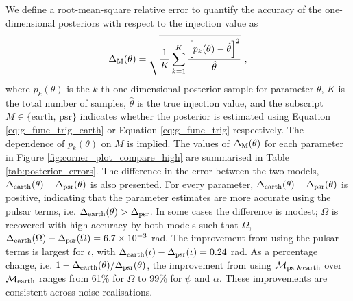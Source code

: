 \documentclass[fleqn,usenatbib,useAMS]{mnras}
\begin{document}
We define a root-mean-square relative error to quantify the accuracy of the one-dimensional posteriors with respect to the injection value as
\begin{equation}
\Delta_{\rm M}(\theta) = \sqrt{\frac{1}{K}\sum_{k=1}^{K} \frac{ \left[p_k(\theta) - \hat{\theta}\right]^2}{\hat{\theta}}} \ , \label{eq:mean_rel_error}
\end{equation}
where $p_k(\theta)$ is the $k$-th one-dimensional posterior sample for parameter $\theta$, $K$ is the total number of samples, $\hat{\theta}$ is the true injection value, and the subscript $M \in \{ \text{earth, psr} \}$ indicates whether the posterior is estimated using Equation \eqref{eq:g_func_trig_earth} or Equation \eqref{eq:g_func_trig} respectively. The dependence of $p_k(\theta)$ on $M$ is implied. The values of $\Delta_{\rm M}(\theta)$ for each parameter in Figure \ref{fig:corner_plot_compare_high} are summarised in Table \ref{tab:posterior_errors}. The difference in the error between the two models, $\Delta_{\rm earth}(\theta)-\Delta_{\rm psr}(\theta)$ is also presented. For every parameter, $\Delta_{\rm earth}(\theta)-\Delta_{\rm psr}(\theta)$ is positive, indicating that the parameter estimates are more accurate using the pulsar terms, i.e. $\Delta_{\rm earth}(\theta) > \Delta_{\rm psr}$. In some cases the difference is modest;  $\Omega$ is recovered with high accuracy by both models such that $\Omega$, $\Delta_{\rm earth}(\Omega)-\Delta_{\rm psr}(\Omega) = 6.7 \times 10^{-3}$ rad. The improvement from using the pulsar terms is largest for $\iota$, with $\Delta_{\rm earth}(\iota) - \Delta_{\rm psr}(\iota)  = 0.24$ rad. As a percentage change, i.e. $1 - \Delta_{\rm earth}(\theta)/\Delta_{\rm psr}(\theta)$, the improvement from using $\mathcal{M}_{\rm psr \& earth}$ over $\mathcal{M}_{\rm earth}$ ranges from 61\% for $\Omega$ to 99\% for $\psi$ and $\alpha$. These improvements are consistent across noise realisations. \newline 
\end{document}
